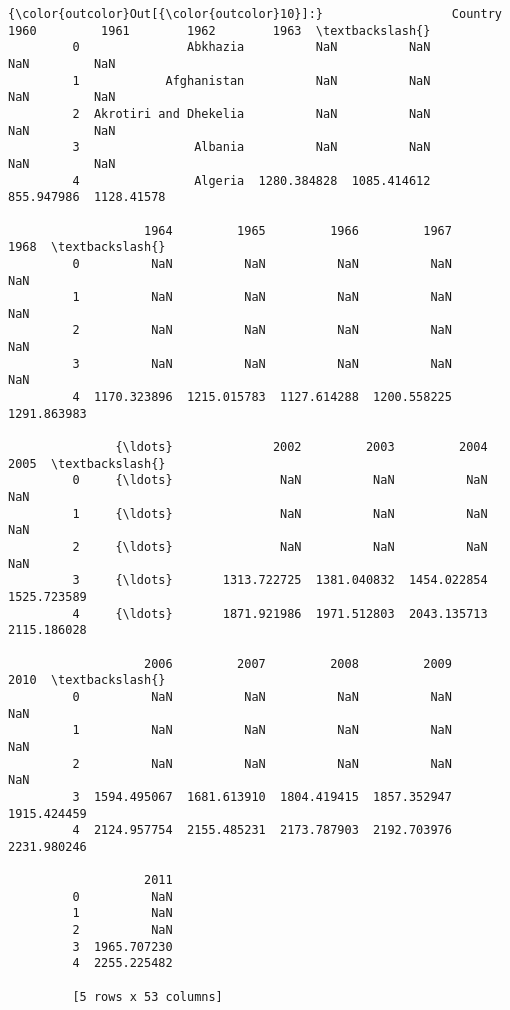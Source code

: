 \documentclass[11pt]{article}
\begin{document}
\begin{Verbatim}[commandchars=\\\{\}]
{\color{outcolor}Out[{\color{outcolor}10}]:}                  Country         1960         1961        1962        1963  \textbackslash{}
         0               Abkhazia          NaN          NaN         NaN         NaN   
         1            Afghanistan          NaN          NaN         NaN         NaN   
         2  Akrotiri and Dhekelia          NaN          NaN         NaN         NaN   
         3                Albania          NaN          NaN         NaN         NaN   
         4                Algeria  1280.384828  1085.414612  855.947986  1128.41578   
         
                   1964         1965         1966         1967         1968  \textbackslash{}
         0          NaN          NaN          NaN          NaN          NaN   
         1          NaN          NaN          NaN          NaN          NaN   
         2          NaN          NaN          NaN          NaN          NaN   
         3          NaN          NaN          NaN          NaN          NaN   
         4  1170.323896  1215.015783  1127.614288  1200.558225  1291.863983   
         
               {\ldots}              2002         2003         2004         2005  \textbackslash{}
         0     {\ldots}               NaN          NaN          NaN          NaN   
         1     {\ldots}               NaN          NaN          NaN          NaN   
         2     {\ldots}               NaN          NaN          NaN          NaN   
         3     {\ldots}       1313.722725  1381.040832  1454.022854  1525.723589   
         4     {\ldots}       1871.921986  1971.512803  2043.135713  2115.186028   
         
                   2006         2007         2008         2009         2010  \textbackslash{}
         0          NaN          NaN          NaN          NaN          NaN   
         1          NaN          NaN          NaN          NaN          NaN   
         2          NaN          NaN          NaN          NaN          NaN   
         3  1594.495067  1681.613910  1804.419415  1857.352947  1915.424459   
         4  2124.957754  2155.485231  2173.787903  2192.703976  2231.980246   
         
                   2011  
         0          NaN  
         1          NaN  
         2          NaN  
         3  1965.707230  
         4  2255.225482  
         
         [5 rows x 53 columns]
\end{Verbatim}
            
\end{document}
